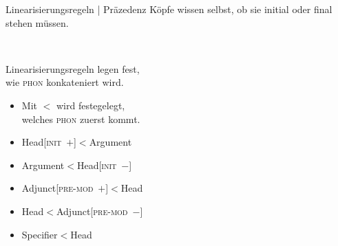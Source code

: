 \begin{frame}
  {Linearisierungsregeln | Präzedenz}
  \onslide<+->
  \onslide<+->
  Köpfe wissen selbst, ob sie \alert{initial} oder \alert{final} stehen müssen.\\
  \Zeile
  \onslide<+->
  \centering 
  \begin{minipage}{0.45\textwidth}
    \centering 
    \\
    \Zeile

    \onslide<+->
    \Viertelzeile
  \end{minipage}\onslide<+->\hspace{2em}%
  \begin{minipage}{0.45\textwidth}
    Linearisierungsregeln legen fest,\\
    wie \textsc{phon} konkateniert wird.\\
    \Halbzeile
    \begin{itemize}[<+->]
      \item Mit $<$ wird festegelegt,\\
        welches \textsc{phon} zuerst kommt.
        \Halbzeile
      \item Head[\textsc{init\ $+$}]$<$Argument
      \item Argument$<$Head[\textsc{init\ $-$}]
      \Halbzeile
      \item Adjunct[\textsc{pre-mod\ $+$}]$<$Head
      \item Head$<$Adjunct[\textsc{pre-mod\ $-$}]
        \Halbzeile
      \item Specifier$<$Head
    \end{itemize}
  \end{minipage}
\end{frame}


